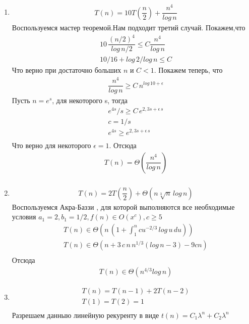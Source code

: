 \documentclass[a4paper, 11pt]{article} %
\begin{document}
\begin{enumerate}
\item
\begin{align*}
&T(n) = 10T(\dfrac{n}{2}) + \dfrac{n^4}{log\,n}
\end{align*}
Воспользуемся мастер теоремой.Нам подходит третий случай. Покажем,что 
\begin{align*}
&10\,\dfrac{(n/2)^4}{log\,n/2} \leq C \dfrac{n^4}{log\,n}\\
&10/16 + log\,2/log\,n \leq C
\end{align*}
Что верно при достаточно больших $n$ и $C < 1$. Покажем теперь, что 
\begin{align*}
&\dfrac{n^4}{log\,n} \geq C\, n ^ {log\,10 + \epsilon}
\end{align*}
Пусть $n = e^s$, для некоторого s, тогда
\begin{align*}
&e^{4s}/s \geq C\, e^{2,3s + \epsilon \,s}\\
&c = 1/s \\
&e^{4s} \geq e^{2,3s+\epsilon \,s}\\
\end{align*}
Что верно для некоторого $\epsilon = 1$. Отсюда 
\begin{align*}
&T(n) = \Theta (\dfrac{n^4}{log\,n})\\
\end{align*}
\item 
\begin{align*}
&T(n) = 2T(\dfrac{n}{2}) + \Theta (n\sqrt[3]{n}\,log\,n)
\end{align*}
Воспользуемся Акра-Баззи , для которой выполняются все необходимые условия $a_1 = 2, b_1 = 1/2 , f(n) \in O(x^c),c \geq 5$
\begin{align*}
&T(n) \in \Theta(n\,(1+\int_{1}^{n} cu^{-2/3}\,log\,u\,du ))\\
&T(n) \in \Theta(n + 3\,c\,n\,n ^{1/3} (log\,n -3 ) - 9cn)\\
\end{align*}
Отсюда
\begin{align*}
&T(n) \in \Theta(n^{4/3}log\,n)
\end{align*}
\item 
\begin{align*}
&T(n) = T(n-1) + 2T(n-2)\\
&T(1) = T(2) = 1\\
\end{align*}
Разрешаем данныю линейную рекуренту в виде $t(n) = C_1\lambda^n + C_2\lambda^n$
\begin{align*}

\end{align*}
\end{enumerate}
\end{document}
